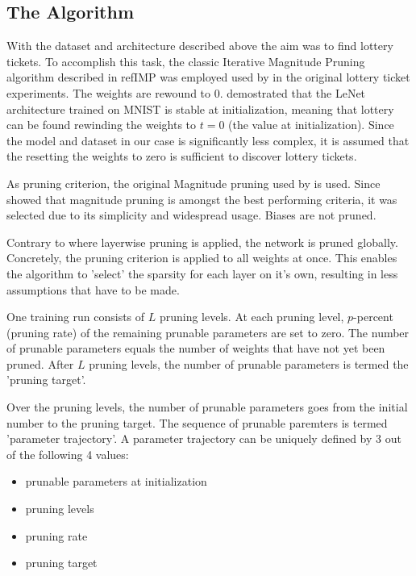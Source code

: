 \subsection{The Algorithm}
With the dataset and architecture described above the aim was to find lottery tickets.
To accomplish this task, the classic Iterative Magnitude Pruning algorithm described in refIMP was employed used by \textcite{DBLP:conf/iclr/FrankleC19} in the original lottery ticket experiments.
The weights are rewound to $0$.
\textcite{LinearModeConnectivity} demostrated that the LeNet architecture trained on MNIST is stable at initialization, meaning that lottery can be found rewinding the weights to $t=0$ (the value at initialization). 
Since the model and dataset in our case is significantly less complex, it is assumed that the resetting the weights to zero is sufficient to discover lottery tickets.

As pruning criterion, the original Magnitude pruning used by \autocite{DBLP:conf/iclr/FrankleC19} is used. 
Since \autocite{DBLP:conf/nips/ZhouLLY19} showed that magnitude pruning is amongst the best performing criteria, it was selected due to its simplicity and widespread usage.
Biases are not pruned.

Contrary to \autocite{DBLP:conf/iclr/FrankleC19} where layerwise pruning is applied, the network is pruned globally.
Concretely, the pruning criterion is applied to all weights at once.
This enables the algorithm to 'select' the sparsity for each layer on it's own, resulting in less assumptions that have to be made.

One training run consists of $L$ pruning levels. 
At each pruning level, $p$-percent (pruning rate) of the remaining prunable parameters are set to zero.
The number of prunable parameters equals the number of weights that have not yet been pruned.
After $L$ pruning levels, the number of prunable parameters is termed the 'pruning target'.

Over the pruning levels, the number of prunable parameters goes from the initial number to the pruning target.
The sequence of prunable paremters is termed 'parameter trajectory'.
A parameter trajectory can be uniquely defined by 3 out of the following 4 values:
\begin{itemize}
    \item prunable parameters at initialization
    \item pruning levels
    \item pruning rate
    \item pruning target
\end{itemize}


